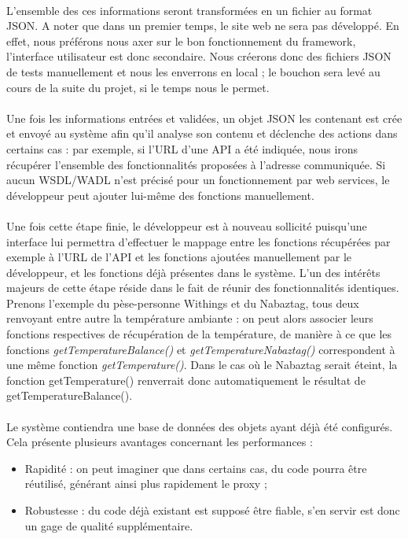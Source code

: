 \documentclass[nocopyrightspace]{sigplanconf}
\begin{document}
		\paragraph{}
		L’ensemble des ces informations seront transformées en un fichier au format JSON. A noter que dans un premier temps, le site web ne sera pas développé. En effet, nous préférons nous axer sur le bon fonctionnement du framework, l’interface utilisateur est donc secondaire. Nous créerons donc des fichiers JSON de tests manuellement et nous les enverrons en local ; le bouchon sera levé au cours de la suite du projet, si le temps nous le permet.

		\paragraph{}
		Une fois les informations entrées et validées, un objet JSON les contenant est crée et envoyé au système afin qu’il analyse son contenu et déclenche des actions dans certains cas : par exemple, si l’URL d’une API a été indiquée, nous irons récupérer l’ensemble des fonctionnalités proposées à l’adresse communiquée. Si aucun WSDL/WADL n’est précisé pour un fonctionnement par web services, le développeur peut ajouter lui-même des fonctions manuellement.

		\paragraph{}
		Une fois cette étape finie, le développeur est à nouveau sollicité puisqu’une interface lui permettra d’effectuer le mappage entre les fonctions récupérées par exemple à l’URL de l’API
		et les fonctions ajoutées manuellement par le développeur, et les fonctions déjà présentes dans le système. L’un des intérêts majeurs de cette étape réside dans le fait de réunir des fonctionnalités identiques. Prenons l’exemple du pèse-personne Withings et du Nabaztag, tous deux renvoyant entre autre la température ambiante : on peut alors associer leurs fonctions respectives de récupération de la température, de manière à ce que les fonctions \emph{getTemperatureBalance()} et \emph{getTemperatureNabaztag()} correspondent à une même fonction \emph{getTemperature()}. Dans le cas où le Nabaztag serait éteint, la fonction getTemperature() renverrait donc automatiquement le résultat de getTemperatureBalance().

		\paragraph{}
		Le système contiendra une base de données des objets ayant déjà été configurés. Cela présente plusieurs avantages concernant les performances :
			\begin{itemize}
				\item Rapidité : on peut imaginer que dans certains cas, du code pourra être réutilisé, générant ainsi plus rapidement le proxy ;
				\item Robustesse : du code déjà existant est supposé être fiable, s’en servir est donc un gage de qualité supplémentaire.
			\end{itemize}
\end{document}
